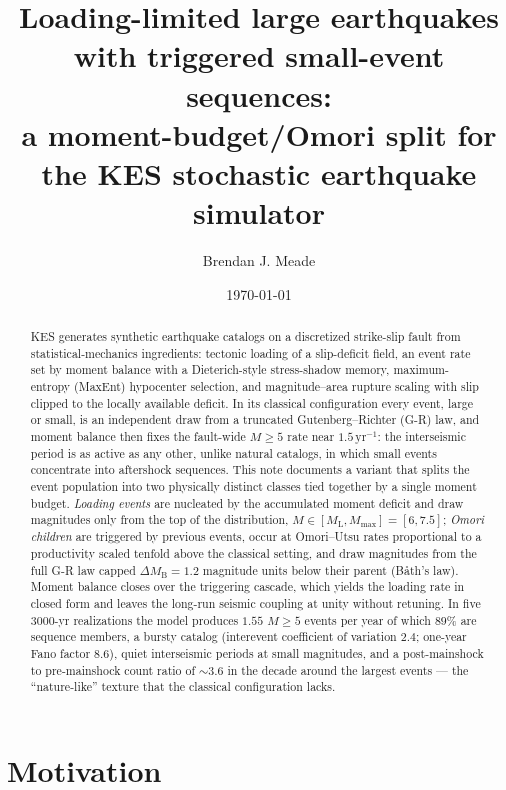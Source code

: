 \documentclass[11pt]{article}
\title{Loading-limited large earthquakes with triggered small-event sequences:\\
a moment-budget/Omori split for the KES stochastic earthquake simulator}
\author{Brendan J. Meade}
\date{\today}
\newcommand{\Mmax}{M_{\max}}
\newcommand{\ML}{M_{\mathrm{L}}}
\newcommand{\dM}{\Delta M_{\mathrm{B}}}
\begin{document}
\maketitle

\begin{abstract}
\noindent
KES generates synthetic earthquake catalogs on a discretized strike-slip fault from
statistical-mechanics ingredients: tectonic loading of a slip-deficit field, an event
rate set by moment balance with a Dieterich-style stress-shadow memory, maximum-entropy
(MaxEnt) hypocenter selection, and magnitude--area rupture scaling with slip clipped to
the locally available deficit. In its classical configuration every event, large or
small, is an independent draw from a truncated Gutenberg--Richter (G-R) law, and moment
balance then fixes the fault-wide $M\ge 5$ rate near $1.5\,\mathrm{yr^{-1}}$: the
interseismic period is as active as any other, unlike natural catalogs, in which small
events concentrate into aftershock sequences. This note documents a variant that splits
the event population into two physically distinct classes tied together by a single
moment budget. \emph{Loading events} are nucleated by the accumulated moment deficit and
draw magnitudes only from the top of the distribution, $M \in [\ML,\Mmax] = [6, 7.5]$;
\emph{Omori children} are triggered by previous events, occur at Omori--Utsu rates
proportional to a productivity scaled tenfold above the classical setting, and draw
magnitudes from the full G-R law capped $\dM = 1.2$ magnitude units below their parent
(B\aa th's law). Moment balance closes over the triggering cascade, which yields the
loading rate in closed form and leaves the long-run seismic coupling at unity without
retuning. In five $3000$-yr realizations the model produces $1.55$ $M\ge5$ events per
year of which $89\%$ are sequence members, a bursty catalog (interevent coefficient of
variation $2.4$; one-year Fano factor $8.6$), quiet interseismic periods at small
magnitudes, and a post-mainshock to pre-mainshock count ratio of $\sim3.6$ in the decade
around the largest events --- the ``nature-like'' texture that the classical
configuration lacks.
\end{abstract}

\section{Motivation}
\end{document}
